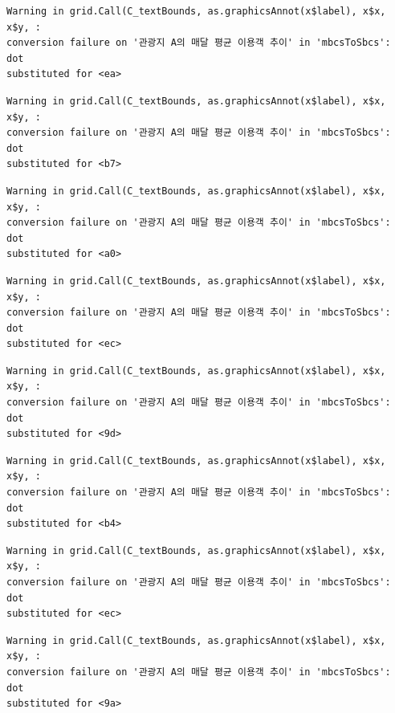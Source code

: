 \documentclass[
  letterpaper,
  DIV=11,
  numbers=noendperiod]{scrreprt}
\begin{document}
\begin{verbatim}
Warning in grid.Call(C_textBounds, as.graphicsAnnot(x$label), x$x, x$y, :
conversion failure on '관광지 A의 매달 평균 이용객 추이' in 'mbcsToSbcs': dot
substituted for <ea>
\end{verbatim}

\begin{verbatim}
Warning in grid.Call(C_textBounds, as.graphicsAnnot(x$label), x$x, x$y, :
conversion failure on '관광지 A의 매달 평균 이용객 추이' in 'mbcsToSbcs': dot
substituted for <b7>
\end{verbatim}

\begin{verbatim}
Warning in grid.Call(C_textBounds, as.graphicsAnnot(x$label), x$x, x$y, :
conversion failure on '관광지 A의 매달 평균 이용객 추이' in 'mbcsToSbcs': dot
substituted for <a0>
\end{verbatim}

\begin{verbatim}
Warning in grid.Call(C_textBounds, as.graphicsAnnot(x$label), x$x, x$y, :
conversion failure on '관광지 A의 매달 평균 이용객 추이' in 'mbcsToSbcs': dot
substituted for <ec>
\end{verbatim}

\begin{verbatim}
Warning in grid.Call(C_textBounds, as.graphicsAnnot(x$label), x$x, x$y, :
conversion failure on '관광지 A의 매달 평균 이용객 추이' in 'mbcsToSbcs': dot
substituted for <9d>
\end{verbatim}

\begin{verbatim}
Warning in grid.Call(C_textBounds, as.graphicsAnnot(x$label), x$x, x$y, :
conversion failure on '관광지 A의 매달 평균 이용객 추이' in 'mbcsToSbcs': dot
substituted for <b4>
\end{verbatim}

\begin{verbatim}
Warning in grid.Call(C_textBounds, as.graphicsAnnot(x$label), x$x, x$y, :
conversion failure on '관광지 A의 매달 평균 이용객 추이' in 'mbcsToSbcs': dot
substituted for <ec>
\end{verbatim}

\begin{verbatim}
Warning in grid.Call(C_textBounds, as.graphicsAnnot(x$label), x$x, x$y, :
conversion failure on '관광지 A의 매달 평균 이용객 추이' in 'mbcsToSbcs': dot
substituted for <9a>
\end{verbatim}
\end{document}
